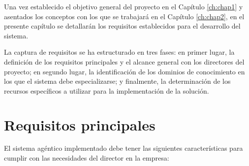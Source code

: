 Una vez establecido el objetivo general del proyecto en el Capítulo \ref{ch:chap1} y asentados los conceptos con los que se trabajará en el Capítulo \ref{ch:chap2}, en el presente capítulo se detallarán los requisitos establecidos para el desarrollo del sistema.

La captura de requisitos se ha estructurado en tres fases: en primer lugar, la definición de los requisitos principales y el alcance general con los directores del proyecto; en segundo lugar, la identificación de los dominios de conocimiento en los que el sistema debe especializarse; y finalmente, la determinación de los recursos específicos a utilizar para la implementación de la solución.

\section{Requisitos principales}

El sistema agéntico implementado debe tener las siguientes características para cumplir con las necesidades del director en la empresa: 

